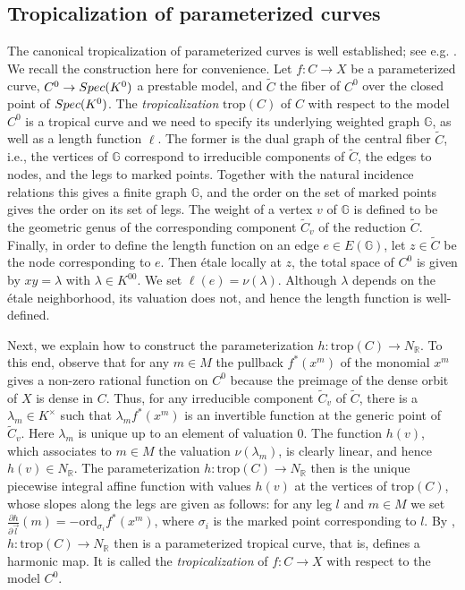 \documentclass[11pt,reqno]{amsart}
\numberwithin{equation}{section}
\theoremstyle{definition}
\newcommand{\trop}{\mathrm{trop}}
\newcommand{\val}{{\rm val}}
\newcommand{\Spec}{{\rm Spec}}
\newcommand{\RR}{{\mathbb R}}
\newcommand{\GG}{{\mathbb G}}
\def\:{\colon}
\def\val{\nu}
\theoremstyle{remark}
\begin{document}
\subsection{Tropicalization of parameterized curves} The canonical tropicalization of parameterized curves is well established; see e.g. \cite{Tyo12,CHT23}. We recall the  construction here for convenience.  
Let $f\: C \to X$ be a parameterized curve, $C^0 \to \Spec(K^0)$ a prestable model, and $\widetilde C$ the fiber of $C^0$ over the closed point of $\Spec(K^0)$.
The \emph{tropicalization} $\trop(C)$ of $C$ with respect to the model $C^0$ is a tropical curve and we need to specify its underlying weighted graph $\GG$, as well as a length function $\ell$. The former is the dual graph of the central fiber $\widetilde C$, i.e., the vertices of $\mathbb G$ correspond to irreducible components of $\widetilde C$, the edges to nodes, and the legs to marked points. Together with the natural incidence relations this gives a finite graph $\mathbb G$, and the order on the set of marked points gives the order on its set of legs. The weight of a vertex $v$ of $\mathbb G$ is defined to be the geometric genus of the corresponding component $\widetilde C_v$ of the reduction $\widetilde C$. Finally, in order to define the length function on an edge $e\in E(\GG)$, let $z\in \widetilde C$ be the node corresponding to $e$. Then \'etale locally at $z$, the total space of $C^0$ is given by $xy=\lambda$ with $\lambda\in K^{00}$. We set $\ell(e) = \nu(\lambda)$. Although $\lambda$ depends on the \'etale neighborhood, its valuation does not, and hence the length function is well-defined.

Next, we explain how to construct the parameterization $h\:\trop(C)\to N_\RR$. To this end, observe that for any $m \in M$ the pullback $f^*(x^m)$ of the monomial $x^m$ gives a non-zero rational function on $C^0$ because the preimage of the dense orbit of $X$ is dense in $C$. Thus, for any irreducible component $\widetilde C_v$ of $\widetilde C$, there is a $\lambda_m \in K^\times$ such that $\lambda_m f^*(x^m)$ is an invertible function at the generic point of $\widetilde C_v$. Here $\lambda_m$ is unique up to an element of valuation $0$. The function $h(v)$, which associates to $m \in M$ the valuation $\val(\lambda_m)$, is clearly linear, and hence $h(v)\in N_\RR$. The parameterization $h\:\trop(C)\to N_\RR$ then is the unique piecewise integral affine function with values $h(v)$ at the vertices of $\trop(C)$, whose slopes along the legs are given as follows: for any leg $l$ and $m\in M$ we set $\frac{\partial h}{\partial \vec l}(m)=-\mathrm{ord}_{\sigma_i} f^*(x^m)$, where $\sigma_i$ is the marked point corresponding to $l$. By \cite[Lemma 2.23]{Tyo12}, $h\:\trop(C)\to N_\RR$ then is a parameterized tropical curve, that is, defines a harmonic map. It is called the \emph{tropicalization} of $f\: C \to X$ with respect to the model $C^0$. 
\end{document}
